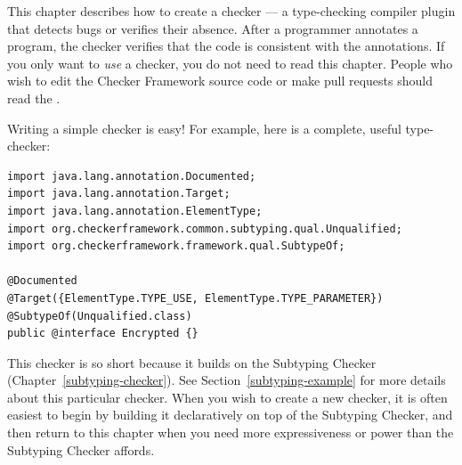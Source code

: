 \label{writing-a-checker} %

\newcommand{\TreeAPIBase}{https://docs.oracle.com/en/java/javase/25/docs/api/jdk.compiler/com/sun/source}
\newcommand{\refTreeclass}[2]{\href{\TreeAPIBase{}/#1/#2.html?is-external=true}{\<#2>}}
\newcommand{\ModelAPIBase}{https://docs.oracle.com/en/java/javase/25/docs/api/java.compiler/javax/lang/model}
\newcommand{\refModelclass}[2]{\href{\ModelAPIBase{}/#1/#2.html?is-external=true}{\<#2>}}

This chapter describes how to create a checker
--- a type-checking compiler plugin that detects bugs or verifies their
absence.  After a programmer annotates a program,
the checker verifies that the code is consistent
with the annotations.
If you only want to \emph{use} a checker, you do not need to read this
chapter.
People who wish to edit the Checker Framework source code or
make pull requests should read the
.


Writing a simple checker is easy!  For example, here is a complete, useful
type-checker:

\begin{Verbatim}
import java.lang.annotation.Documented;
import java.lang.annotation.Target;
import java.lang.annotation.ElementType;
import org.checkerframework.common.subtyping.qual.Unqualified;
import org.checkerframework.framework.qual.SubtypeOf;

@Documented
@Target({ElementType.TYPE_USE, ElementType.TYPE_PARAMETER})
@SubtypeOf(Unqualified.class)
public @interface Encrypted {}
\end{Verbatim}

This checker is so short because it builds on the Subtyping Checker
(Chapter~\ref{subtyping-checker}).
See Section~\ref{subtyping-example} for more details about this particular checker.
When you wish to create a new checker, it is often easiest to begin by
building it declaratively on top of the Subtyping Checker, and then return to
this chapter when you need more expressiveness or power than the Subtyping
Checker affords.


